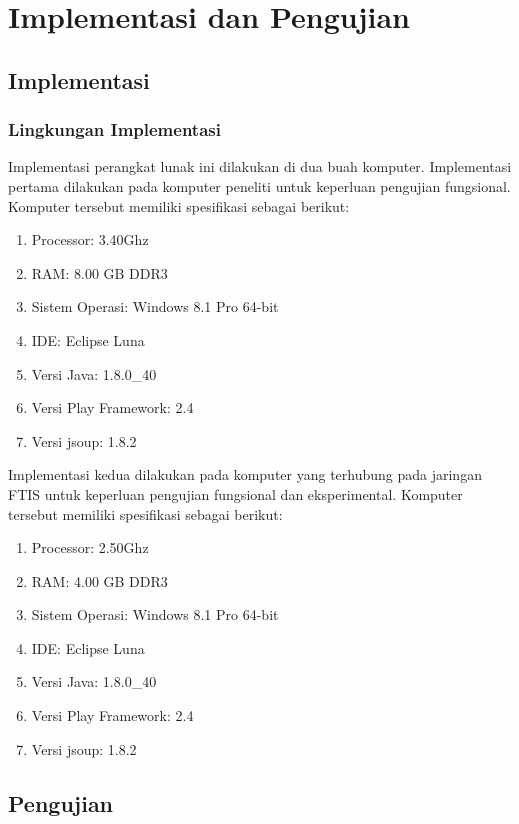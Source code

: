 \chapter{Implementasi dan Pengujian}
\label{chap:implementasiPengujian}

\section{Implementasi}
\label{sec:implementasi}

\subsection{Lingkungan Implementasi}
		\label{sec:lingkungan_implementasi}
			Implementasi perangkat lunak ini dilakukan di dua buah komputer. Implementasi pertama dilakukan pada komputer peneliti untuk keperluan pengujian fungsional. Komputer tersebut memiliki spesifikasi sebagai berikut:
				\begin{enumerate}
					\item Processor: 3.40Ghz 
					\item RAM: 8.00 GB DDR3	
					\item Sistem Operasi: Windows 8.1 Pro 64-bit 
					\item IDE: Eclipse Luna
					\item Versi Java: 1.8.0\_40
					\item Versi Play Framework: 2.4
					\item Versi jsoup: 1.8.2
				\end{enumerate}
			Implementasi kedua dilakukan pada komputer yang terhubung pada jaringan FTIS untuk keperluan pengujian fungsional dan eksperimental. Komputer tersebut memiliki spesifikasi sebagai berikut:
					\begin{enumerate}
						\item Processor: 2.50Ghz 
						\item RAM: 4.00 GB DDR3	
						\item Sistem Operasi: Windows 8.1 Pro 64-bit 
						\item IDE: Eclipse Luna
						\item Versi Java: 1.8.0\_40
						\item Versi Play Framework: 2.4
						\item Versi jsoup: 1.8.2
					\end{enumerate}
						
	\section{Pengujian}
